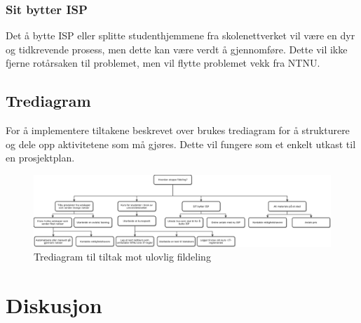 \subsubsection{Sit bytter ISP}
Det å bytte ISP eller splitte studenthjemmene fra skolenettverket vil være en dyr og tidkrevende prosess, men dette kan være verdt å gjennomføre. Dette vil ikke fjerne rotårsaken til problemet, men vil flytte problemet vekk fra NTNU.

\subsection{Trediagram}
For å implementere tiltakene beskrevet over brukes trediagram for å strukturere og dele opp aktivitetene som må gjøres. Dette vil fungere som et enkelt utkast til en prosjektplan. 

\begin{figure}[H] 
    \centering    
    \includegraphics[scale=0.55, angle=90]{case_1/bilder/Tre-diagram.pdf}
    \caption[Trediagram til tiltak mot ulovlig fildeling]{Trediagram til tiltak mot ulovlig fildeling}
    \label{fig:case1-Tre-diagram}
\end{figure}

\section{Diskusjon}
